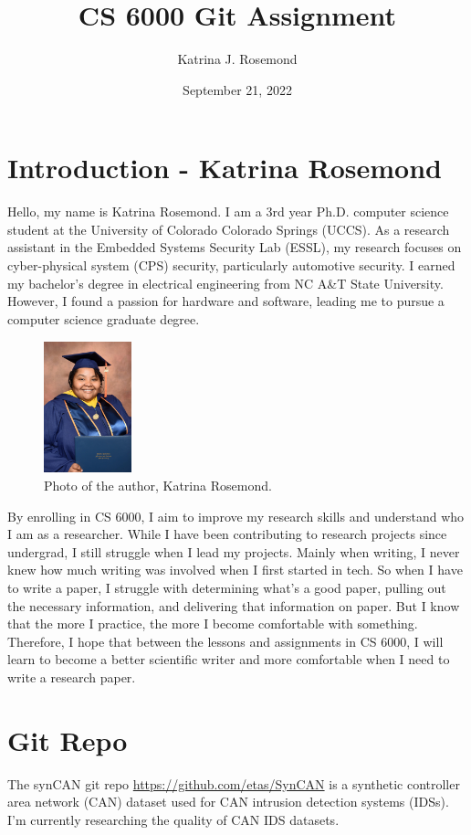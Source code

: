 \graphicspath{{./images/}}

\title{CS 6000 Git Assignment}

\author{Katrina J. Rosemond}
\date{September 21, 2022}

%


\section{Introduction - Katrina Rosemond}

Hello, my name is Katrina Rosemond. I am a 3rd year Ph.D. computer science 
student at the University of Colorado Colorado Springs (UCCS). As a 
research assistant in the Embedded Systems Security Lab (ESSL), my 
research focuses on cyber-physical system (CPS) security, particularly 
automotive security. I earned my bachelor's degree in electrical 
engineering from NC A\&T State University. However, I found a passion for 
hardware and software, leading me to pursue a computer science graduate 
degree. 

\begin{figure}[ht]
    \centering
    \includegraphics[width= 1in, height= 1.5in]{RosemondGrad.jpg}
    \caption{Photo of the author, Katrina Rosemond.}
\end{figure}

By enrolling in CS 6000, I aim to improve my research skills and 
understand who I am as a researcher. While I have been contributing to 
research projects since undergrad, I still struggle when I lead my 
projects. Mainly when writing, I never knew how much writing was involved 
when I first started in tech. So when I have to write a paper, I struggle 
with determining what's a good paper, pulling out the necessary 
information, and delivering that information on paper. But I know that the 
more I practice, the more I become comfortable with something. Therefore, 
I hope that between the lessons and assignments in CS 6000, I will learn 
to become a better scientific writer and more comfortable when I need to 
write a research paper.

\section{Git Repo}
The synCAN git repo \url{https://github.com/etas/SynCAN} is a synthetic 
controller area network (CAN) dataset used for CAN intrusion detection 
systems (IDSs). I'm currently researching the quality of CAN IDS datasets.

